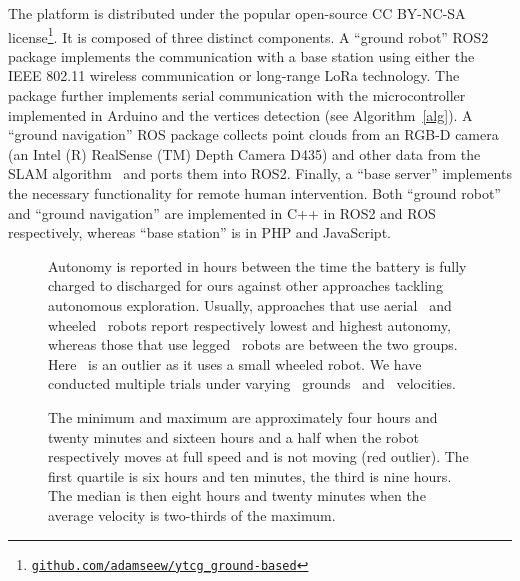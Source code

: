 \documentclass[lettersize,journal,twoside]{IEEEtran}
\theoremstyle{definition}
\begin{document}
The %
platform
is distributed under the popular open-source CC BY-NC-SA license\footnote{{\tt\footnotesize \href{https://github.com/adamseew/ytcg_ground-based}{github.com/adamseew/ytcg\_ground-based}}}. It is composed of three distinct components. A ``ground robot'' ROS2 %
package implements the communication with a base station using either the IEEE 802.11 wireless communication or long-range LoRa technology. The package further implements serial communication with the microcontroller implemented in Arduino and the vertices detection (see Algorithm~\ref{alg}). A ``ground navigation'' ROS package collects point clouds from an RGB-D camera (an Intel (R) RealSense (TM) Depth Camera %
D435) and other data from the SLAM algorithm~\cite{labbe2019rtab} and ports them into ROS2. Finally, a ``base server'' implements the necessary functionality for remote human intervention.
Both ``ground robot'' and ``ground navigation'' are implemented in C++ in ROS2 and ROS respectively, whereas ``base station'' is in PHP and JavaScript.

\begin{figure}[t]
  \vspace*{-.5cm}
  \begin{minipage}[t]{0.57\columnwidth}
    \hspace*{-.5cm}
    
  \end{minipage}\hfill
  \begin{minipage}[t]{0.42\columnwidth}
    \vspace*{-5.1cm}
    \centering
    \caption{Autonomy is reported in hours between the time the battery is fully charged to discharged for ours against other approaches tackling autonomous exploration. 
    Usually, approaches that use aerial~\cite{schmid2020efficient,kulkarni2022autonomous} and wheeled~\cite{muller2021openbot,roucek2020darpa,surmann2003autonomous} robots report respectively lowest and highest autonomy, whereas those that use legged~\cite{kulkarni2022autonomous,tranzatto2022cerberus} robots are between the two groups. Here~\cite{muller2021openbot} is an outlier as it uses a small wheeled robot. We have conducted multiple trials under varying ~grounds ~and ~velocities.}
    \label{fig}
  \end{minipage}
  \vspace*{-.68cm}
  \caption*{The minimum and maximum are approximately four hours and twenty minutes and sixteen hours and a half when the robot respectively moves at full speed and is not moving (red outlier). The first quartile is six hours and ten minutes, the third is nine hours. The median is then eight hours and twenty minutes when the average velocity is two-thirds of the maximum.}
  \vspace*{-.3cm}
\end{figure}
\end{document}
